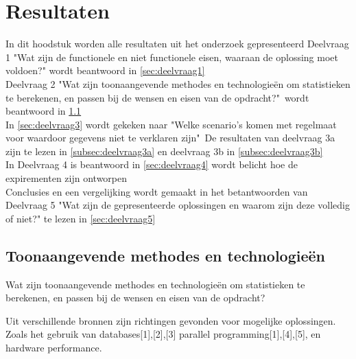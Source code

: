 \chapter{Resultaten}

In dit hoodstuk worden alle resultaten uit het onderzoek gepresenteerd
Deelvraag 1 "Wat zijn de functionele en niet functionele eisen, waaraan de oplossing moet voldoen?" wordt beantwoord in \ref{sec:deelvraag1} \\

Deelvraag 2 "Wat zijn toonaangevende methodes en technologieën om statistieken te berekenen, en passen bij de wensen en eisen van de opdracht?"\  wordt beantwoord in \ref{sec:deelvraag2} \\

In \ref{sec:deelvraag3} wordt gekeken naar "Welke scenario's komen met regelmaat voor waardoor gegevens niet te verklaren zijn"\  
De resultaten van deelvraag 3a zijn te lezen in \ref{subsec:deelvraag3a} en deelvraag 3b in \ref{subsec:deelvraag3b} \\

In Deelvraag 4 is beantwoord in \ref{sec:deelvraag4} wordt belicht hoe de expirementen zijn ontworpen \\

Conclusies en een vergelijking wordt gemaakt in het betantwoorden van Deelvraag 5 "Wat zijn de gepresenteerde oplossingen en waarom zijn deze volledig of niet?" te lezen in \ref{sec:deelvraag5}


\clearpage



\clearpage

\section{Toonaangevende methodes en technologieën}
\label{sec:deelvraag2}

Wat zijn toonaangevende methodes en technologieën om statistieken te berekenen, en passen bij de wensen en eisen van de opdracht?

Uit verschillende bronnen zijn richtingen gevonden voor mogelijke oplossingen. Zoals het gebruik van databases[1],[2],[3] parallel programming[1],[4],[5], en hardware performance.

